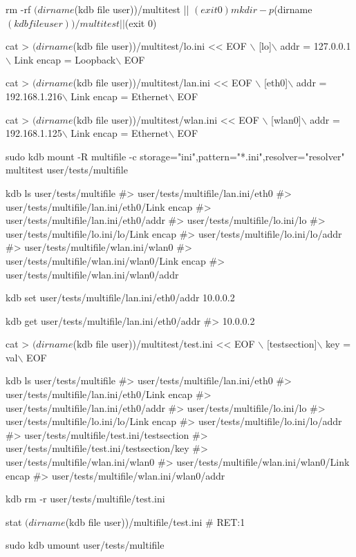 \begin{DoxyCode}
rm -rf $(dirname $(kdb file user))/multitest || $(exit 0)
mkdir -p $(dirname $(kdb file user))/multitest || $(exit 0)

cat > $(dirname $(kdb file user))/multitest/lo.ini << EOF \(\backslash\)
[lo]\(\backslash\)
addr = 127.0.0.1\(\backslash\)
Link encap = Loopback\(\backslash\)
EOF

cat > $(dirname $(kdb file user))/multitest/lan.ini << EOF \(\backslash\)
[eth0]\(\backslash\)
addr = 192.168.1.216\(\backslash\)
Link encap = Ethernet\(\backslash\)
EOF

cat > $(dirname $(kdb file user))/multitest/wlan.ini << EOF \(\backslash\)
[wlan0]\(\backslash\)
addr = 192.168.1.125\(\backslash\)
Link encap = Ethernet\(\backslash\)
EOF

sudo kdb mount -R multifile -c storage="ini",pattern="*.ini",resolver="resolver" multitest
       user/tests/multifile

kdb ls user/tests/multifile
#> user/tests/multifile/lan.ini/eth0
#> user/tests/multifile/lan.ini/eth0/Link encap
#> user/tests/multifile/lan.ini/eth0/addr
#> user/tests/multifile/lo.ini/lo
#> user/tests/multifile/lo.ini/lo/Link encap
#> user/tests/multifile/lo.ini/lo/addr
#> user/tests/multifile/wlan.ini/wlan0
#> user/tests/multifile/wlan.ini/wlan0/Link encap
#> user/tests/multifile/wlan.ini/wlan0/addr

kdb set user/tests/multifile/lan.ini/eth0/addr 10.0.0.2

kdb get user/tests/multifile/lan.ini/eth0/addr
#> 10.0.0.2

cat > $(dirname $(kdb file user))/multitest/test.ini << EOF \(\backslash\)
[testsection]\(\backslash\)
key = val\(\backslash\)
EOF

kdb ls user/tests/multifile
#> user/tests/multifile/lan.ini/eth0
#> user/tests/multifile/lan.ini/eth0/Link encap
#> user/tests/multifile/lan.ini/eth0/addr
#> user/tests/multifile/lo.ini/lo
#> user/tests/multifile/lo.ini/lo/Link encap
#> user/tests/multifile/lo.ini/lo/addr
#> user/tests/multifile/test.ini/testsection
#> user/tests/multifile/test.ini/testsection/key
#> user/tests/multifile/wlan.ini/wlan0
#> user/tests/multifile/wlan.ini/wlan0/Link encap
#> user/tests/multifile/wlan.ini/wlan0/addr

kdb rm -r user/tests/multifile/test.ini

stat $(dirname $(kdb file user))/multifile/test.ini
# RET:1

sudo kdb umount user/tests/multifile
\end{DoxyCode}


